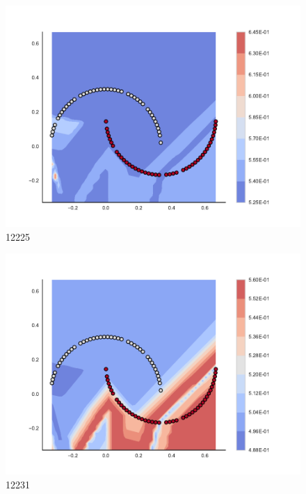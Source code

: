 \begin{subfigure}[b]{0.09\textwidth}
    \includegraphics[clip, trim=2.35cm 1.75cm 4.5cm 0cm,width=\textwidth]{img/convergence/12225.pdf}
    \caption{12225}
    \label{fig:convergence_12225}
\end{subfigure}
%
\begin{subfigure}[b]{0.09\textwidth}
    \includegraphics[clip, trim=2.35cm 1.75cm 4.5cm 0cm,width=\textwidth]{img/convergence/12231.pdf}
    \caption{12231}
    \label{fig:convergence_12231}
\end{subfigure}
%
